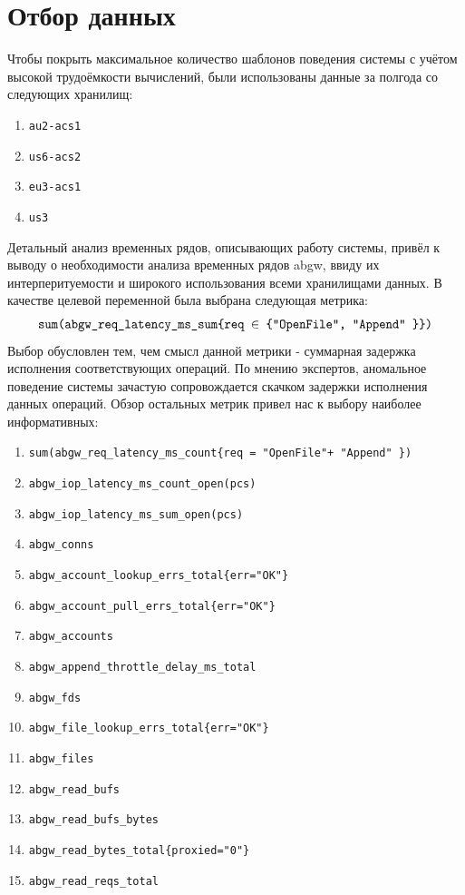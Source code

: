 \documentclass[14pt, a4paper]{extarticle}
\begin{document}
	\section{Отбор данных}
	Чтобы покрыть максимальное количество шаблонов поведения системы с учётом высокой трудоёмкости вычислений, были использованы данные за полгода со следующих хранилищ:
	\begin{enumerate}
	 	\item \texttt{au2-acs1}
	 	\item \texttt{us6-acs2}
	 	\item \texttt{eu3-acs1}
	 	\item \texttt{us3}
	 \end{enumerate}\label{list_of_dc}
	
	Детальный анализ временных рядов, описывающих работу системы, привёл к выводу о необходимости анализа временных рядов abgw, ввиду их интерперитуемости и широкого использования всеми хранилищами данных. В качестве целевой переменной была выбрана следующая метрика:
	$$\texttt{sum(abgw\_req\_latency\_ms\_sum\{req $\in$ \{"OpenFile"\\, "Append" \}\})}$$
	Выбор обусловлен тем, чем смысл данной метрики - суммарная задержка исполнения соответствующих операций. По мнению экспертов, аномальное поведение системы зачастую сопровождается скачком задержки исполнения данных операций.  Обзор остальных метрик привел нас к выбору наиболее информативных:
	 \begin{enumerate}
	 	\item \texttt{sum(abgw\_req\_latency\_ms\_count\{req = "OpenFile"+ "Append" \})} 
	 	\item \texttt{abgw\_iop\_latency\_ms\_count\_open(pcs)}
	 	\item \texttt{abgw\_iop\_latency\_ms\_sum\_open(pcs)}
	 	\item \texttt{abgw\_conns}
	 	\item \texttt{abgw\_account\_lookup\_errs\_total\{err="OK"\}}
	 	\item \texttt{abgw\_account\_pull\_errs\_total\{err="OK"\}}
	    \item \texttt{abgw\_accounts}
	 	\item \texttt{abgw\_append\_throttle\_delay\_ms\_total}
	 	\item \texttt{abgw\_fds}
	 	\item \texttt{abgw\_file\_lookup\_errs\_total\{err="OK"\}}
	 	\item \texttt{abgw\_files}
	 	\item \texttt{abgw\_read\_bufs}
	 	\item \texttt{abgw\_read\_bufs\_bytes}	
	 	\item \texttt{abgw\_read\_bytes\_total\{proxied="0"\}}	
	 	\item \texttt{abgw\_read\_reqs\_total}	
	 \end{enumerate}\label{list_of_metrics}
	
\end{document}
